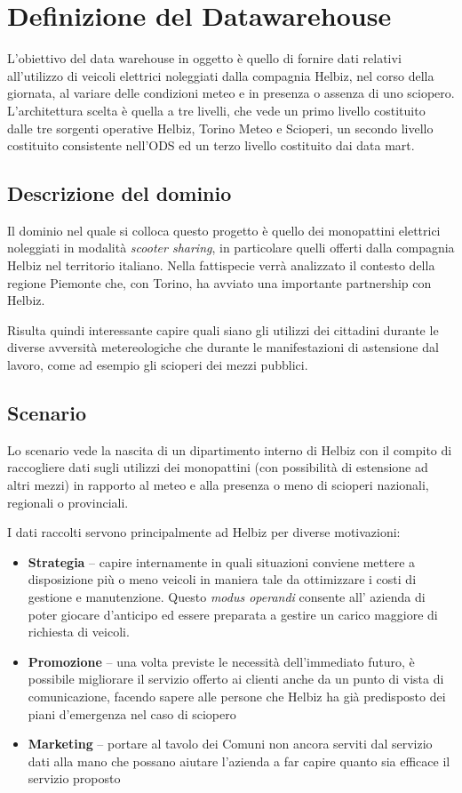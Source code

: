 \chapter{Definizione del Datawarehouse}

L'obiettivo del data warehouse in oggetto è quello di fornire dati relativi
all'utilizzo di veicoli elettrici noleggiati dalla compagnia Helbiz, nel corso
della giornata, al variare delle condizioni meteo e in presenza o assenza di uno
sciopero.
L'architettura scelta è quella a tre livelli, che vede un primo livello costituito
dalle tre sorgenti operative Helbiz, Torino Meteo e Scioperi, un secondo livello
costituito consistente nell'ODS ed un terzo livello costituito dai data mart.

\section{Descrizione del dominio}
Il dominio nel quale si colloca questo progetto è quello dei monopattini elettrici noleggiati in
modalità \emph{scooter sharing}, in particolare quelli offerti dalla compagnia Helbiz nel territorio italiano.
Nella fattispecie verrà analizzato il contesto della regione Piemonte che, con Torino, ha avviato una importante
partnership con Helbiz.

Risulta quindi interessante capire quali siano gli utilizzi dei cittadini durante le diverse avversità metereologiche
che durante le manifestazioni di astensione dal lavoro, come ad esempio gli scioperi dei mezzi pubblici.


\section{Scenario}
Lo scenario vede la nascita di un dipartimento interno di Helbiz con il compito di raccogliere dati sugli
utilizzi dei monopattini (con possibilità di estensione ad altri mezzi) in rapporto al meteo e alla presenza
o meno di scioperi nazionali, regionali o provinciali.

I dati raccolti servono principalmente ad Helbiz per diverse motivazioni:
\begin{itemize}
	\item{\textbf{Strategia} -- capire internamente in quali situazioni conviene mettere a disposizione più o meno veicoli in maniera tale da ottimizzare i costi di gestione e manutenzione.
	Questo \emph{modus operandi} consente all' azienda di poter giocare d'anticipo ed essere preparata a gestire un carico maggiore di richiesta di veicoli.}
	\item{\textbf{Promozione} -- una volta previste le necessità dell'immediato futuro, è possibile migliorare il servizio offerto ai clienti anche da un punto di vista di comunicazione,
	facendo sapere alle persone che Helbiz ha già predisposto dei piani d'emergenza nel caso di sciopero}
	\item{\textbf{Marketing} -- portare al tavolo dei Comuni non ancora serviti dal servizio dati alla mano che possano aiutare l'azienda a far capire quanto sia efficace il servizio proposto}
\end{itemize}

